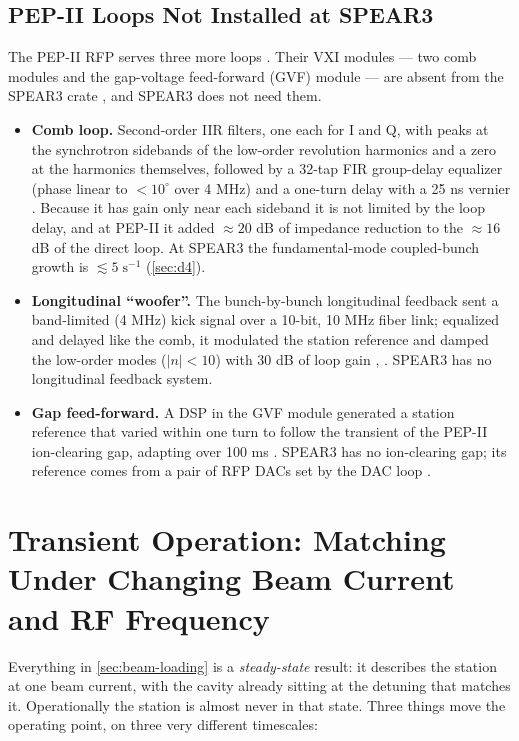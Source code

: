 \subsection{PEP-II Loops Not Installed at SPEAR3}\label{sec:loop-pepii}

The PEP-II RFP serves three more loops . Their VXI modules --- two comb modules and the gap-voltage feed-forward (GVF) module --- are absent from the SPEAR3 crate , and SPEAR3 does not need them.

\begin{itemize}
\item \textbf{Comb loop.} Second-order IIR filters, one each for I and Q, with peaks at the synchrotron sidebands of the low-order revolution harmonics and a zero at the harmonics themselves, followed by a 32-tap FIR group-delay equalizer (phase linear to \(< 10^\circ\) over 4 MHz) and a one-turn delay with a 25 ns vernier . Because it has gain only near each sideband it is not limited by the loop delay, and at PEP-II it added \(\approx 20\) dB of impedance reduction to the \(\approx 16\) dB of the direct loop. At SPEAR3 the fundamental-mode coupled-bunch growth is \(\lesssim 5\;\text{s}^{-1}\) (\cref{sec:d4}).
\item \textbf{Longitudinal ``woofer''.} The bunch-by-bunch longitudinal feedback sent a band-limited (4 MHz) kick signal over a 10-bit, 10 MHz fiber link; equalized and delayed like the comb, it modulated the station reference and damped the low-order modes (\(\lvert n\rvert < 10\)) with 30 dB of loop gain , . SPEAR3 has no longitudinal feedback system.
\item \textbf{Gap feed-forward.} A DSP in the GVF module generated a station reference that varied within one turn to follow the transient of the PEP-II ion-clearing gap, adapting over 100 ms . SPEAR3 has no ion-clearing gap; its reference comes from a pair of RFP DACs set by the DAC loop .
\end{itemize}

\FloatBarrier\clearpage
\section{Transient Operation: Matching Under Changing Beam Current and RF Frequency}\label{sec:transient}


Everything in \cref{sec:beam-loading} is a \emph{steady-state} result: it describes the station at one beam current, with the cavity already sitting at the detuning that matches it. Operationally the station is almost never in that state. Three things move the operating point, on three very different timescales:

